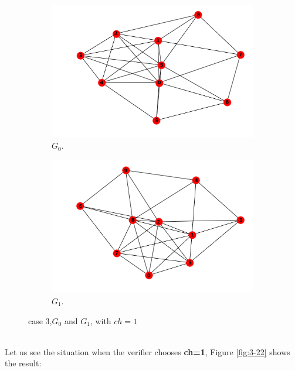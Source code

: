 \documentclass[12pt,a4paper]{article}
\begin{document}
\begin{itemize}
 \begin{figure}[h!]
 	\centering\begin{subfigure}[b]{.35\linewidth}
 		\includegraphics[width=\linewidth]{3-20.png}
 		\caption{$G_0$.}
 	\end{subfigure}
 	\begin{subfigure}[b]{.35\linewidth}
 		\includegraphics[width=\linewidth]{3-21.png}
 		\caption{$G_1$.}
 	\end{subfigure}
 	\caption{case 3,$G_0$ and $G_1$, with $ch=1$}
 	\label{fig:case 3,$G_0$ and $G_1$, with $ch=1$}
 \end{figure}\\
Let us see the situation when the verifier chooses \textbf{ch=1}, Figure \ref{fig:3-22} shows the result:\\
\begin{figure}[h]
	\centering

\end{figure}
\end{itemize}
\end{document}
